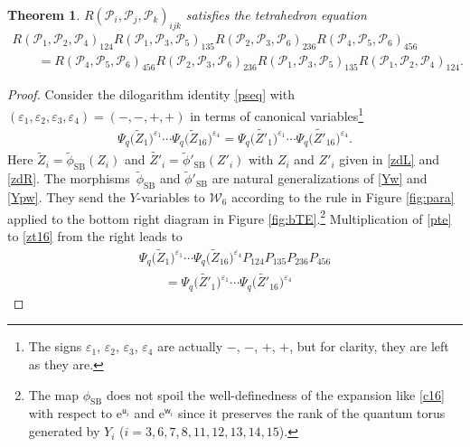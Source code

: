 \documentclass[11pt]{article}
\numberwithin{equation}{section}
\newcommand{\e}{{\mathrm e}}
\newcommand{\uu}{{\mathsf u}}
\newcommand{\ww}{{\mathsf w}}
\numberwithin{equation}{section}
\newtheorem{Theorem}{Theorem}[section]
\begin{document}
\begin{Theorem}\label{th:main}
$R(\mathscr{P}_i, \mathscr{P}_j, \mathscr{P}_k)_{ijk} $ satisfies the tetrahedron equation
\begin{gather}
 R(\mathscr{P}_1, \mathscr{P}_2, \mathscr{P}_4)_{124}
R(\mathscr{P}_1, \mathscr{P}_3, \mathscr{P}_5)_{135}
R(\mathscr{P}_2, \mathscr{P}_3, \mathscr{P}_6)_{236}
R(\mathscr{P}_4, \mathscr{P}_5, \mathscr{P}_6)_{456}\nonumber
\\
\qquad= R(\mathscr{P}_4, \mathscr{P}_5, \mathscr{P}_6)_{456}
R(\mathscr{P}_2, \mathscr{P}_3, \mathscr{P}_6)_{236}
R(\mathscr{P}_1, \mathscr{P}_3, \mathscr{P}_5)_{135}
R(\mathscr{P}_1, \mathscr{P}_2, \mathscr{P}_4)_{124}.\label{tela}
\end{gather}
\end{Theorem}
\begin{proof}
 Consider the dilogarithm identity \eqref{pseq} with
 $(\varepsilon_1,\varepsilon_2,\varepsilon_3,\varepsilon_4) =(-, -,
 +, +)$ in terms of canonical variables\footnote{The signs
 $\varepsilon_1$, $\varepsilon_2$, $\varepsilon_3$, $\varepsilon_4$
 are actually $-$, $-$, $+$, $+$, but for clarity, they are left as
 they are.}
\begin{align}\label{zt16}
\Psi_q\bigl(\tilde{Z}_1\bigr)^{\varepsilon_1}\dotsm \Psi_q\bigl({\tilde Z}_{16}\bigr)^{\varepsilon_4}
=
\Psi_q\bigl(\tilde{Z'}_1\bigr)^{\varepsilon_1}\dotsm \Psi_q\bigl(\tilde{Z'}_{16}\bigr)^{\varepsilon_4}.
\end{align}
Here $\tilde{Z}_i = \tilde{\phi}_\mathrm{SB}(Z_i)$ and
$\tilde{Z'}_i =\tilde{\phi}'_\mathrm{SB}(Z'_i)$ with $Z_i$ and $Z'_i$
given in \eqref{zdL} and \eqref{zdR}. The morphisms~$\tilde{\phi}_\mathrm{SB}$ and $\tilde{\phi}'_\mathrm{SB}$ are natural
generalizations of \eqref{Yw} and \eqref{Ypw}. They send the
$Y$-variables to $\mathcal{W}_6$ according to the rule in Figure
\ref{fig:para} applied to the bottom right diagram in Figure
\ref{fig:bTE}.\footnote{The map $\phi_\mathrm{SB}$ does not spoil the
 well-definedness of the expansion like \eqref{c16} with respect to
 $\e^{\uu_i}$ and $\e^{\ww_i}$ since it preserves the rank of the quantum
 torus generated by $Y_i$ ($i=3, 6 , 7 , 8 , 11 , 12 , 13 ,
 14 , 15$).}
%
Multiplication of \eqref{pte} to \eqref{zt16} from the right leads to
\begin{gather}
\Psi_q\bigl(\tilde{Z}_1\bigr)^{\varepsilon_1}\dotsm \Psi_q\bigl({\tilde Z}_{16}\bigr)^{\varepsilon_4}
P_{124}P_{135}P_{236}P_{456}\nonumber\\
\qquad=
\Psi_q\bigl(\tilde{Z'}_1\bigr)^{\varepsilon_1}\dotsm \Psi_q\bigl(\tilde{Z'}_{16}\bigr)^{\varepsilon_4}

\end{gather}
\end{proof}
\end{document}

